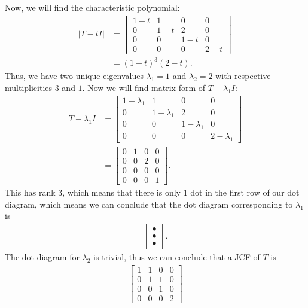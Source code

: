 \documentclass[10pt,a4paper]{article}
\theoremstyle{definition}
\begin{document}
Now, we will find the characteristic polynomial:
\begin{align*}
|T - t I| &= \begin{vmatrix}
1 - t &1 &0 &0\\
0 &1 - t &2 &0\\
0 &0 &1 - t &0\\
0 &0 &0 &2 - t
\end{vmatrix}\\
&= (1-t)^3 (2 - t).
\end{align*}
Thus, we have two unique eigenvalues $\lambda_1 = 1$ and $\lambda_2 = 2$ with respective multiplicities $3$ and $1$. Now we will find matrix form of $T - \lambda_1 I$:
\begin{align*}
T - \lambda_1 I &= \begin{bmatrix}
1 - \lambda_1 &1 &0 &0\\
0 &1 - \lambda_1 &2 &0\\
0 &0 &1 - \lambda_1 &0\\
0 &0 &0 &2 - \lambda_1
\end{bmatrix}\\
&= \begin{bmatrix}
0 &1 &0 &0\\
0 &0 &2 &0\\
0 &0 &0 &0\\
0 &0 &0 &1
\end{bmatrix}.
\end{align*}
This has rank 3, which means that there is only 1 dot in the first row of our dot diagram, which means we can conclude that the dot diagram corresponding to $\lambda_1$ is
\begin{align*}
\begin{bmatrix}
\bullet\\
\bullet\\
\bullet
\end{bmatrix}.
\end{align*}
The dot diagram for $\lambda_2$ is trivial, thus we can conclude that a JCF of $T$ is
\begin{align*}
\begin{bmatrix}
1 &1 &0 &0\\
0 &1 &1 &0\\
0 &0 &1 &0\\
0 &0 &0 &2
\end{bmatrix}
\end{align*}
\end{document}
